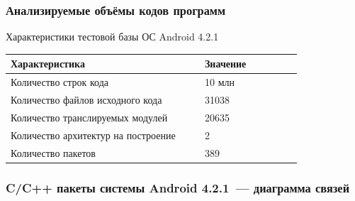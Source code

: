 \documentclass[hyperref={pdfpagelabels=false}]{beamer}
\begin{document}
\begin{frame}
\frametitle{Анализируемые объёмы кодов программ}
Характеристики тестовой базы ОС Android 4.2.1
\begin{table} [htbp]
  \centering
  \parbox{15cm}{\label{table:android-char}}
  \begin{tabular}{| p{0.6\linewidth} || p{0.3\linewidth} |}
  \hline
  \hline
  Характеристика   & Значение \\
  \hline
  \hline
  Количество строк кода   & 10 млн \\
  \hline
  Количество файлов исходного кода      & 31038    \\
  \hline
  Количество транслируемых модулей  & 20635   \\
  \hline
  Количество архитектур на построение & 2   \\
  \hline
  Количество пакетов & 389 \\
  \hline
  \hline
  \end{tabular}
\end{table}
\end{frame}
\begin{frame}
\frametitle{C/C++ пакеты системы Android 4.2.1~--- диаграмма связей}
\begin{figure}[h]
\end{figure}
\end{frame}

\end{document}
